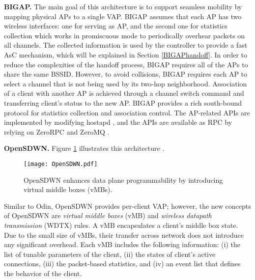 \textbf{BIGAP.}
The main goal of this architecture \cite{BIGAP} is to support seamless mobility by mapping physical APs to a single VAP.
BIGAP assumes that each AP has two wireless interfaces: one for serving as AP, and the second one for statistics collection which works in promiscuous mode to periodically overhear packets on all channels.
The collected information is used by the controller to provide a fast AsC mechanism, which will be explained in Section \ref{BIGAPhandoff}.
In order to reduce the complexities of the handoff process, BIGAP requires all of the APs to share the same BSSID.
However, to avoid collisions, BIGAP requires each AP to select a channel that is not being used by its two-hop neighborhood.
Association of a client with another AP is achieved through a channel switch command and transferring client's status to the new AP.
BIGAP provides a rich south-bound protocol for statistics collection and association control.
The AP-related APIs are implemented by modifying hostapd \cite{hostapd}, and the APIs are available as RPC by relying on ZeroRPC \cite{zerorpc} and ZeroMQ \cite{zeromq}.


\textbf{OpenSDWN.}
Figure \ref{fig_OpenSDWN} illustrates this architecture \cite{OpenSDWN}. 
%
\begin{figure}[!t]
	\centering
	\texttt{[image: OpenSDWN.pdf]}
	\caption{OpenSDWN \cite{OpenSDWN} enhances data plane programmability by introducing virtual middle boxes (vMBs).}
	\label{fig_OpenSDWN}
\end{figure}
%
Similar to Odin, OpenSDWN provides per-client VAP; however, the new concepts of OpenSDWN are \textit{virtual middle boxes} (vMB) and \textit{wireless datapath transmission} (WDTX) rules. 
A vMB encapsulates a client's middle box state. 
Due to the small size of vMBs, their transfer across network does not introduce any significant overhead.
Each vMB includes the following information:
(i) the list of tunable parameters of the client,
(ii) the states of client's active connections,
(iii) the packet-based statistics, and
(iv) an event list that defines the behavior of the client. %

